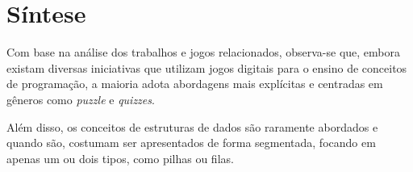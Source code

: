 \section{Síntese}

Com base na análise dos trabalhos e jogos relacionados, observa-se que, embora
existam diversas iniciativas que utilizam jogos digitais para o ensino de
conceitos de programação, a maioria adota abordagens mais explícitas e
centradas em gêneros como \emph{puzzle} e \emph{quizzes}.

Além disso, os conceitos de estruturas de dados são raramente abordados e
quando são, costumam ser apresentados de forma segmentada, focando em apenas um
ou dois tipos, como pilhas ou filas.
